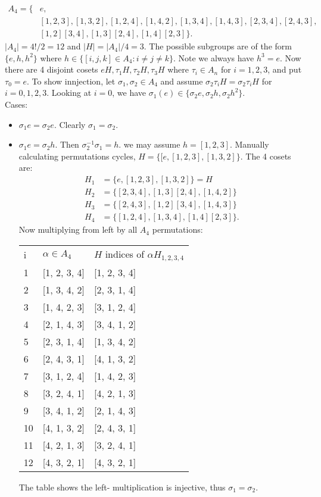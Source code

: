 \documentclass[12pt]{book}
\newcounter{myenumi}
\newenvironment{myenumerate}
{\begin{enumerate}
 \setcounter{enumi}{\themyenumi}
}
{\setcounter{myenumi}{\theenumi}
 \end{enumerate}}
\begin{document}
\begin{myenumerate}
\begin{enumerate}[(a)]
\begin{align*}
A_4 = \{&e, \\
  &[1,2,3], [1, 3, 2], [1,2,4], [1, 4, 2], [1, 3, 4], [1, 4, 3],
    [2, 3, 4], [2, 4, 3], \\
  &[1, 2][3, 4], [1, 3][2, 4], [1, 4][2, 3]\}.
\end{align*}
\(|A_4|=4!/2=12\) and \(|H|=|A_4|/4=3\).
The possible subgroups are of the
form \(\{e, h, h^2\}\) where
\(h \in \{[i,j,k]\in A_4: i\neq j \neq k\}\).
Note we always have \(h^3=e\).
Now there are 4 disjoint cosets \(eH, \tau_1 H, \tau_2 H, \tau_3 H\)
where \(\tau_i \in A_n\) for \(i=1,2,3\), and put \(\tau_0 = e\).
To show innjection, let \(\sigma_1, \sigma_2 \in A_4\)
and assume \(\sigma_2\tau_i H = \sigma_2\tau_i H\) for \(i=0,1,2,3\).
Looking at \(i=0\), we have
\(\sigma_1(e) \in \{\sigma_2 e, \sigma_2 h, \sigma_2 h^2\}\).\\
Cases:
\begin{itemize}
\item \(\sigma_1 e = \sigma_2 e\). Clearly \(\sigma_1 = \sigma_2\).
\item \(\sigma_1 e = \sigma_2 h\). Then \(\sigma_2^{-1}\sigma_1 = h\).
 \Wlogy we may assume \(h=[1,2,3]\).
Manually calculating permutations cycles,
 \(H = \{[e, [1, 2, 3], [1, 3, 2]\}\). The 4 cosets are:
\begin{align*}
H_1 &= \{e, [1, 2, 3], [1, 3, 2]\} = H \\
H_2 &= \{[2, 3, 4], [1, 3][2, 4], [1, 4, 2]\} \\
H_3 &= \{[2, 4, 3], [1, 2][3, 4], [1, 4, 3]\} \\
H_4 &= \{[1, 2, 4], [1, 3, 4], [1, 4][2, 3]\}.
\end{align*}
Now multiplying from left by all \(A_4\) permutations:
\begin{center}
\begin{tabular}{lll}
 i & \(\alpha \in A_4\) & $H$ indices of \(\alpha H_{1,2,3,4}\) \\
 1 & [1, 2, 3, 4] & [1, 2, 3, 4] \\
 2 & [1, 3, 4, 2] & [2, 3, 1, 4] \\
 3 & [1, 4, 2, 3] & [3, 1, 2, 4] \\
 4 & [2, 1, 4, 3] & [3, 4, 1, 2] \\
 5 & [2, 3, 1, 4] & [1, 3, 4, 2] \\
 6 & [2, 4, 3, 1] & [4, 1, 3, 2] \\
 7 & [3, 1, 2, 4] & [1, 4, 2, 3] \\
 8 & [3, 2, 4, 1] & [4, 2, 1, 3] \\
 9 & [3, 4, 1, 2] & [2, 1, 4, 3] \\
10 & [4, 1, 3, 2] & [2, 4, 3, 1] \\
11 & [4, 2, 1, 3] & [3, 2, 4, 1] \\
12 & [4, 3, 2, 1] & [4, 3, 2, 1]
\end{tabular}
\end{center}
The table shows the left- multiplication is injective, 
thus \(\sigma_1=\sigma_2\).


\end{itemize}
\end{enumerate}
\end{myenumerate}
\end{document}
